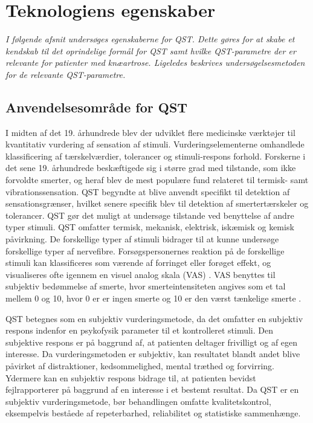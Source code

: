 \section{Teknologiens egenskaber}
\textit{I følgende afsnit undersøges egenskaberne for QST. Dette gøres for at skabe et kendskab til det oprindelige formål for QST samt hvilke QST-parametre der er relevante for patienter med knæartrose. Ligeledes beskrives undersøgelsesmetoden for de relevante QST-parametre.}

\subsection{Anvendelsesområde for QST}
I midten af det 19. århundrede blev der udviklet flere medicinske værktøjer til kvantitativ vurdering af sensation af stimuli. Vurderingselementerne omhandlede klassificering af tærskelværdier, tolerancer og stimuli-respons forhold. \citep{Yarnitsky1997} Forskerne i det sene 19. århundrede beskæftigede sig i større grad med tilstande, som ikke forvoldte smerter, og heraf blev de mest populære fund relateret til termisk- samt vibrationssensation. \citep{Yarnitsky1997} QST begyndte at blive anvendt specifikt til detektion af sensationsgrænser, hvilket senere specifik blev til detektion af smertertærskeler og tolerancer. QST gør det muligt at undersøge tilstande ved benyttelse af andre typer stimuli. QST omfatter termisk, mekanisk, elektrisk, iskæmisk og kemisk påvirkning. \citep{Yarnitsky2006} De forskellige typer af stimuli bidrager til at kunne undersøge forskellige typer af nervefibre. Forsøgspersonernes reaktion på de forskellige stimuli kan klassificeres som værende af forringet eller forøget effekt, og visualiseres ofte igennem en visuel analog skala (VAS) \citep{Yarnitsky2006}. VAS benyttes til subjektiv bedømmelse af smerte, hvor smerteintensiteten angives som et tal mellem 0 og 10, hvor 0 er er ingen smerte og 10 er den værst tænkelige smerte \citep{smerter}. 

QST betegnes som en subjektiv vurderingsmetode, da det omfatter en subjektiv respons indenfor en psykofysik parameter til et kontrolleret stimuli. Den subjektive respons er på baggrund af, at patienten deltager frivilligt og af egen interesse. \citep{Mucke2016} Da vurderingsmetoden er subjektiv, kan resultatet blandt andet blive påvirket af distraktioner, kedsommelighed, mental træthed og forvirring. Ydermere kan en subjektiv respons bidrage til, at patienten bevidst fejlrapporterer på baggrund af en interesse i et bestemt resultat. \citep{Yarnitsky2006} Da QST er en subjektiv vurderingsmetode, bør behandlingen omfatte kvalitetskontrol, eksempelvis beståede af repeterbarhed, reliabilitet og statistiske sammenhænge.


